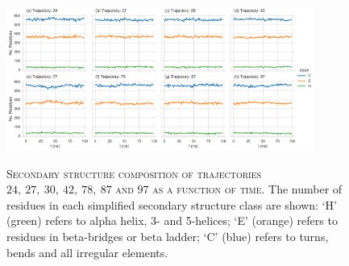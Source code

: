 \begin{figure}[ph!]
 \centering
 \caption[Secondary structure composition of select trajectories]{\textsc{Secondary structure composition of trajectories $24,\ 27,\ 30,\ 42,\ 78,\ 87$ and $97$ as a function of time}. The number of residues in each simplified secondary structure class \cite{kabschDictionaryProteinSecondary1983} are shown: `H' (green) refers to alpha helix, 3- and 5-helices; `E' (orange) refers to residues in beta-bridges or beta ladder; `C' (blue) refers to turns, bends and all irregular elements.}
 \includegraphics[width=0.9\textwidth]{chapters/aadh/figures/drift_trajs_dssp.png}
 \label{fig:dssp_trajs_sens}
\end{figure}

